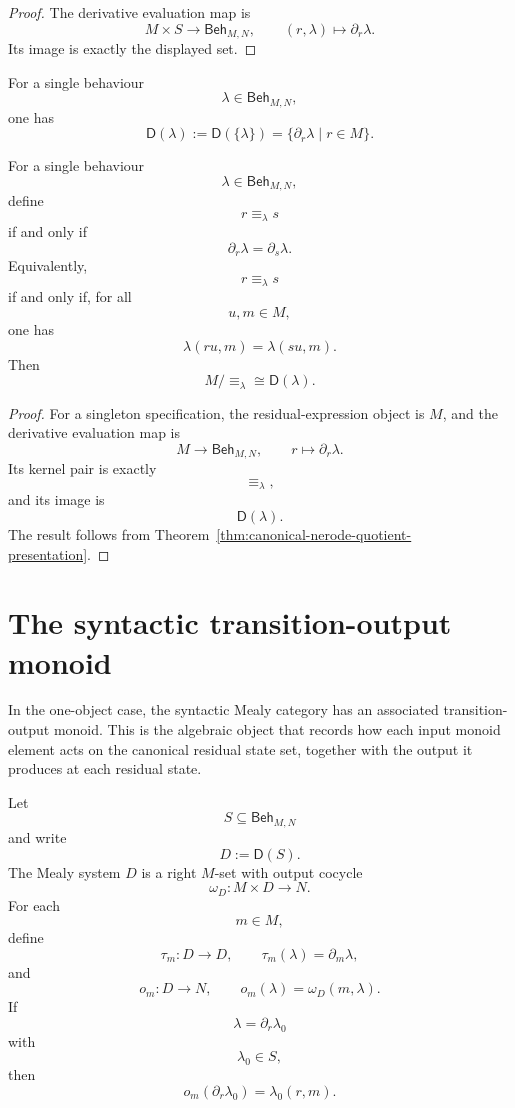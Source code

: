 \begin{proof}
The derivative evaluation map is
\[
M\times S\to \mathsf{Beh}_{M,N},
\qquad
(r,\lambda)\longmapsto \partial_r\lambda.
\]
Its image is exactly the displayed set.
\end{proof}

\begin{corollary}
\label{cor:one-object-singleton-residual-closure}
For a single behaviour
\[
\lambda\in\mathsf{Beh}_{M,N},
\]
one has
\[
\mathsf D(\lambda)
:=
\mathsf D(\{\lambda\})
=
\{\partial_r\lambda\mid r\in M\}.
\]
\end{corollary}

\begin{corollary}
\label{cor:one-object-nerode-quotient}
For a single behaviour
\[
\lambda\in\mathsf{Beh}_{M,N},
\]
define
\[
r\equiv_\lambda s
\]
if and only if
\[
\partial_r\lambda=\partial_s\lambda.
\]
Equivalently,
\[
r\equiv_\lambda s
\]
if and only if, for all
\[
u,m\in M,
\]
one has
\[
\lambda(ru,m)=\lambda(su,m).
\]
Then
\[
M/{\equiv_\lambda}
\cong
\mathsf D(\lambda).
\]
\end{corollary}

\begin{proof}
For a singleton specification, the residual-expression object is \(M\), and
the derivative evaluation map is
\[
M\to\mathsf{Beh}_{M,N},
\qquad
r\longmapsto \partial_r\lambda.
\]
Its kernel pair is exactly
\[
{\equiv_\lambda},
\]
and its image is
\[
\mathsf D(\lambda).
\]
The result follows from
Theorem~\ref{thm:canonical-nerode-quotient-presentation}.
\end{proof}

\section{The syntactic transition-output monoid}
\label{sec:syntactic-transition-output-monoid}

In the one-object case, the syntactic Mealy category has an associated
transition-output monoid. This is the algebraic object that records how each
input monoid element acts on the canonical residual state set, together with
the output it produces at each residual state.

Let
\[
S\subseteq\mathsf{Beh}_{M,N}
\]
and write
\[
D:=\mathsf D(S).
\]
The Mealy system \(D\) is a right \(M\)-set with output cocycle
\[
\omega_D:M\times D\to N.
\]
For each
\[
m\in M,
\]
define
\[
\tau_m:D\to D,
\qquad
\tau_m(\lambda)=\partial_m\lambda,
\]
and
\[
o_m:D\to N,
\qquad
o_m(\lambda)=\omega_D(m,\lambda).
\]
If
\[
\lambda=\partial_r\lambda_0
\]
with
\[
\lambda_0\in S,
\]
then
\[
o_m(\partial_r\lambda_0)=\lambda_0(r,m).
\]

